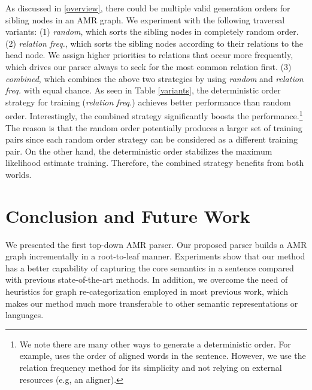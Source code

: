 \documentclass[11pt,a4paper]{article}
\begin{document}
	As discussed in \cref{overview}, there could be multiple valid generation orders for sibling nodes in an AMR graph. We experiment with the following traversal variants: (1) \textit{random}, which sorts the sibling nodes in completely random order. (2) \textit{relation freq.}, which sorts the sibling nodes according to their relations to the head node. We assign higher priorities to relations that occur more frequently, which drives our parser always to seek for the most common relation first. (3) \textit{combined}, which combines the above two strategies by using \textit{random} and \textit{relation freq.} with equal chance. As seen in Table \ref{variants}, the deterministic order strategy for training (\textit{relation freq.}) achieves better performance than random order. Interestingly,  the combined strategy significantly boosts the performance.\footnote{We note there are many other ways to generate a deterministic order. For example,  uses the order of aligned words in the sentence. However, we use the relation frequency method for its simplicity and not relying on external resources (e.g, an aligner). } The reason is that the random order potentially produces a larger set of training pairs since each random order strategy can be considered as a different training pair. On the other hand, the deterministic order stabilizes the maximum likelihood estimate training. Therefore, the combined strategy benefits from both worlds.
\section{Conclusion and Future Work}
	We presented the first top-down AMR parser. Our proposed parser builds a AMR graph incrementally in a root-to-leaf manner. Experiments show that our method has a better capability of capturing the core semantics in a sentence compared with previous state-of-the-art methods. In addition, we overcome the need of heuristics for graph re-categorization employed in most previous work, which makes our method much more transferable to other semantic representations or languages.
	
\end{document}
